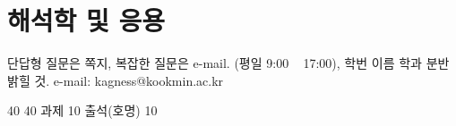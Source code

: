 \chapter{해석학 및 응용}

단답형 질문은 쪽지, 복잡한 질문은 e-mail. (평일 9:00 ~ 17:00), 학번 이름 학과 분반 밝힐 것.
e-mail: kagness@kookmin.ac.kr

40 40 과제 10 출석(호명) 10

